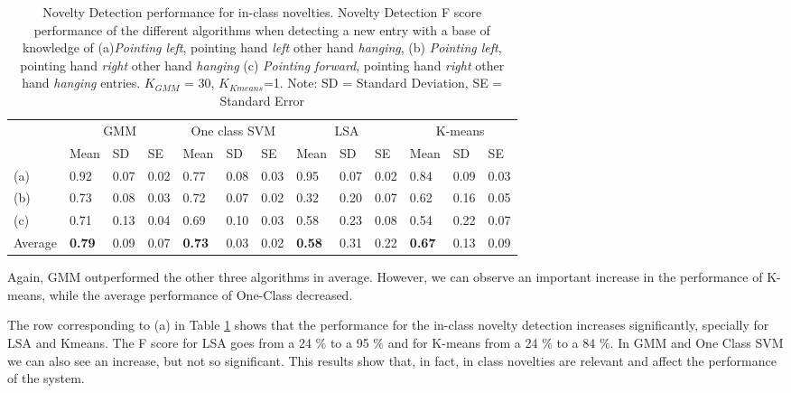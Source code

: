 \begin{table}[!ht]
	\footnotesize
	\renewcommand{\arraystretch}{2}
	\begin{tabular}{p{1.2cm}p{0.7cm}p{0.6cm}p{0.7cm}p{0.7cm}p{0.6cm}p{0.7cm}p{0.7cm}p{0.6cm}p{0.7cm}p{0.7cm}p{0.6cm}p{0.7cm}}
	\hline 
	 & \multicolumn{3}{c}{GMM}& \multicolumn{3}{c}{One class SVM}& \multicolumn{3}{c}{LSA}& \multicolumn{3}{c}{K-means} \\
	 & Mean    & SD & SE& Mean    & SD & SE& Mean    & SD & SE& Mean    & SD & SE \\
	\hline
	(a)  & 0.92 & 0.07 & 0.02 & 0.77 & 0.08 & 0.03 & 0.95 & 0.07 & 0.02 & 0.84 & 0.09 & 0.03       \\
	(b)   & 0.73 & 0.08 & 0.03 & 0.72 & 0.07 & 0.02 & 0.32 & 0.20 & 0.07 & 0.62 & 0.16 & 0.05    \\
	(c)  & 0.71 & 0.13 & 0.04 & 0.69 & 0.10 & 0.03 & 0.58 & 0.23 & 0.08 & 0.54 & 0.22 & 0.07    \\
	Average   & \textbf{0.79} & 0.09 & 0.07 & \textbf{0.73} & 0.03 & 0.02 & \textbf{0.58} & 0.31 & 0.22 & \textbf{0.67} & 0.13 & 0.09   \\
	\hline
	\end{tabular}
	\centering
	\caption[Novelty Detection F score performance for in-class novelties]{Novelty Detection performance for in-class novelties. Novelty Detection F score performance of the different algorithms when detecting a new entry with a base of knowledge of (a)\emph{Pointing left}, pointing hand \emph{left} other hand \emph{hanging}, (b) \emph{Pointing left}, pointing hand \emph{right} other hand \emph{hanging} (c) \emph{Pointing forward}, pointing hand \emph{right} other hand \emph{hanging}  entries. $ K_{GMM} $ = 30, $ K_{Kmeans} $=1. Note: SD = Standard Deviation, SE = Standard Error \label{inclass}}
\end{table}

Again, GMM outperformed the other three algorithms in average. However, we can observe an important increase in the performance of K-means, while the average performance of One-Class decreased.

The row corresponding to (a) in Table \ref{inclass} shows that the performance for the in-class novelty detection increases significantly, specially for LSA and Kmeans. The F score for LSA goes from a 24 $\%$ to a 95 $\%$ and for K-means from a  24 $\%$ to a 84 $\%$. In GMM and One Class SVM we can also see an increase, but not so significant. This results show that, in fact, in class novelties are relevant and affect the performance of the system. 

